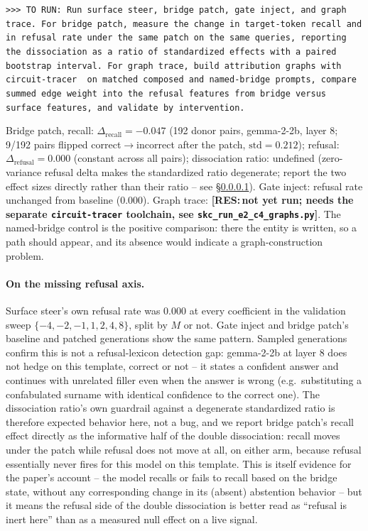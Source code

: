 \documentclass{article}
\newcommand{\RES}[1]{{\color{red}\textbf{[RES:\,#1]}}}
\newcommand{\TORUN}[1]{{\color{blue}\texttt{>{}>{}> TO RUN: #1}}}
\begin{document}
\TORUN{Run surface steer, bridge patch, gate inject, and graph trace. For bridge patch, measure the
change in target-token recall and in refusal rate under the same patch on the same queries, reporting
the dissociation as a ratio of standardized effects with a paired bootstrap interval. For graph trace,
build attribution graphs with \texttt{circuit-tracer} \citep{hanna2025circuittracer} on matched
composed and named-bridge prompts, compare summed edge weight into the refusal features from bridge
versus surface features, and validate by intervention.}

Bridge patch, recall: $\Delta_{\mathrm{recall}}=-0.047$ (192 donor pairs, gemma-2-2b, layer 8; 9/192
pairs flipped correct$\to$incorrect after the patch, $\mathrm{std}=0.212$); refusal:
$\Delta_{\mathrm{refusal}}=0.000$ (constant across all pairs); dissociation ratio: undefined
(zero-variance refusal delta makes the standardized ratio degenerate; report the two effect sizes
directly rather than their ratio -- see \S\ref{sec:res-e2-refusal}). Gate inject: refusal rate
unchanged from baseline (0.000). Graph trace: \RES{not yet run; needs the separate \texttt{circuit-tracer}
toolchain, see \texttt{skc\_run\_e2\_c4\_graphs.py}}. The named-bridge control is the positive
comparison: there the entity is written, so a path should appear, and its absence would indicate a
graph-construction problem.

\paragraph{On the missing refusal axis.}
\label{sec:res-e2-refusal}
Surface steer's own refusal rate was 0.000 at every coefficient in the validation sweep
$\{-4,-2,-1,1,2,4,8\}$, split by $M$ or not. Gate inject and bridge patch's baseline and patched
generations show the same pattern. Sampled generations confirm this is not a refusal-lexicon
detection gap: gemma-2-2b at layer 8 does not hedge on this template, correct or not -- it states a
confident answer and continues with unrelated filler even when the answer is wrong (e.g.\ substituting
a confabulated surname with identical confidence to the correct one). The dissociation ratio's own
guardrail against a degenerate standardized ratio is therefore expected behavior here, not a bug, and
we report bridge patch's recall effect directly as the informative half of the double dissociation:
recall moves under the patch while refusal does not move at all, on either arm, because refusal
essentially never fires for this model on this template. This is itself evidence for the paper's
account -- the model recalls or fails to recall based on the bridge state, without any corresponding
change in its (absent) abstention behavior -- but it means the refusal side of the double dissociation
is better read as ``refusal is inert here'' than as a measured null effect on a live signal.
\end{document}
